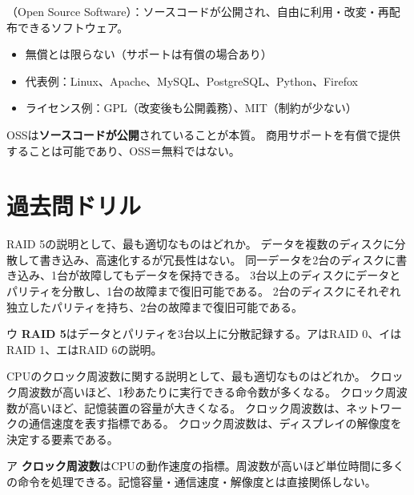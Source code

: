 \begin{teigi}[OSSの特徴]
（Open Source Software）：ソースコードが公開され、自由に利用・改変・再配布できるソフトウェア。
\begin{itemize}
  \item 無償とは限らない（サポートは有償の場合あり）
  \item 代表例：Linux、Apache、MySQL、PostgreSQL、Python、Firefox
  \item ライセンス例：GPL（改変後も公開義務）、MIT（制約が少ない）
\end{itemize}
\end{teigi}

\begin{pitfall}
OSSは\textbf{ソースコードが公開}されていることが本質。
商用サポートを有償で提供することは可能であり、OSS＝無料ではない。
\end{pitfall}

\section{過去問ドリル}


\begin{itpmon}{%
RAID 5の説明として、最も適切なものはどれか。}
\sentakushi
  {データを複数のディスクに分散して書き込み、高速化するが冗長性はない。}
  {同一データを2台のディスクに書き込み、1台が故障してもデータを保持できる。}
  {3台以上のディスクにデータとパリティを分散し、1台の故障まで復旧可能である。}
  {2台のディスクにそれぞれ独立したパリティを持ち、2台の故障まで復旧可能である。}
\end{itpmon}
\begin{kaisetsu}{ウ}
\textbf{RAID 5}はデータとパリティを3台以上に分散記録する。アはRAID 0、イはRAID 1、エはRAID 6の説明。
\end{kaisetsu}

\begin{itpmon}{%
CPUのクロック周波数に関する説明として、最も適切なものはどれか。}
\sentakushi
  {クロック周波数が高いほど、1秒あたりに実行できる命令数が多くなる。}
  {クロック周波数が高いほど、記憶装置の容量が大きくなる。}
  {クロック周波数は、ネットワークの通信速度を表す指標である。}
  {クロック周波数は、ディスプレイの解像度を決定する要素である。}
\end{itpmon}
\begin{kaisetsu}{ア}
\textbf{クロック周波数}はCPUの動作速度の指標。周波数が高いほど単位時間に多くの命令を処理できる。記憶容量・通信速度・解像度とは直接関係しない。
\end{kaisetsu}

